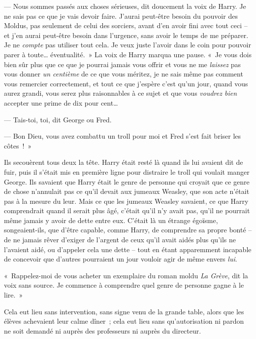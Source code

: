 --- Nous sommes passés aux choses sérieuses, dit doucement la voix de Harry. Je ne sais pas ce que je vais devoir faire. J'aurai peut-être besoin du pouvoir des Moldus, pas seulement de celui des sorciers, avant d'en avoir fini avec tout ceci -- et j'en aurai peut-être besoin dans l'urgence, sans avoir le temps de me préparer. Je ne \emph{compte} pas utiliser tout cela. Je veux juste l'avoir dans le coin pour pouvoir parer à toute… éventualité.~» La voix de Harry marqua une pause. «~Je vous dois bien sûr plus que ce que je pourrai jamais vous offrir et vous ne me \emph{laissez} pas vous donner \emph{un centième} de ce que vous méritez, je ne sais même pas comment vous remercier correctement, et tout ce que j'espère c'est qu'un jour, quand vous aurez grandi, vous serez plus raisonnables à ce sujet et que vous \emph{voudrez bien} accepter une prime de dix pour cent…

--- Tais-toi, toi, dit George ou Fred.

--- Bon Dieu, vous avez combattu un troll pour moi et Fred s'est fait briser les côtes~!~»

Ils secouèrent tous deux la tête. Harry était resté là quand ils lui avaient dit de fuir, puis il s'était mis en première ligne pour distraire le troll qui voulait manger George. Ils savaient que Harry était le genre de personne qui croyait que ce genre de chose n'annulait pas ce qu'il devait aux jumeaux Weasley, que son acte n'était pas à la mesure du leur. Mais ce que les jumeaux Weasley savaient, ce que Harry comprendrait quand il serait plus âgé, c'était qu'il n'y avait pas, qu'il ne pourrait même jamais y avoir de dette entre eux. C'était là un étrange égoïsme, songeaient-ils, que d'être capable, comme Harry, de comprendre sa propre bonté -- de ne jamais rêver d'exiger de l'argent de ceux qu'il avait aidés plus qu'ils ne l'avaient aidé, ou d'appeler cela une dette -- tout en étant apparemment incapable de concevoir que d'autres pourraient un jour vouloir agir de même envers \emph{lui}.

«~Rappelez-moi de vous acheter un exemplaire du roman moldu \emph{La Grève}, dit la voix sans source. Je commence à comprendre quel genre de personne gagne à le lire.~»


Cela eut lieu sans intervention, sans signe venu de la grande table, alors que les élèves achevaient leur calme dîner~; cela eut lieu sans qu'autorisation ni pardon ne soit demandé ni auprès des professeurs ni auprès du directeur.

